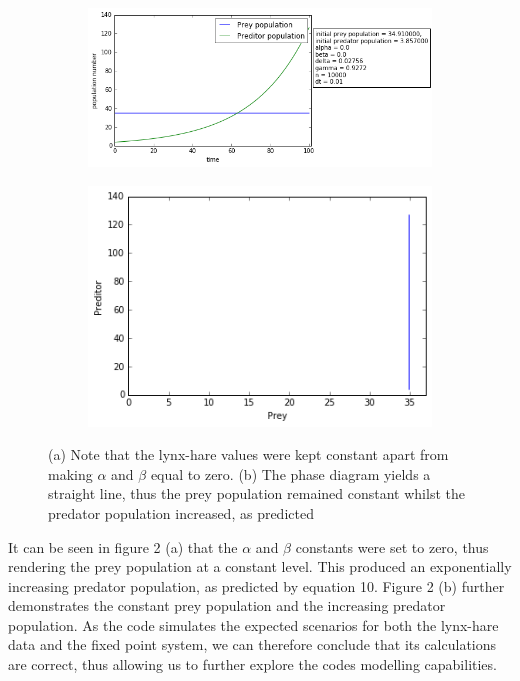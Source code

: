 \documentclass[11pt]{elsarticle}
\begin{document}
\begin{figure}
\centering
   \begin{subfigure}[b]{1\textwidth}
   \includegraphics[width=0.90\linewidth]{figure2_time.png}
   \caption{}
   \label{fig:Ng1} 
\end{subfigure}

\begin{subfigure}[b]{1\textwidth}
   \includegraphics[width=0.59\linewidth]{figure2_phase.png}
   \caption{}
   \label{fig:Ng2}
\end{subfigure}

\caption{(a) Note that the lynx-hare values were kept constant apart from making $\alpha$ and $\beta$ equal to zero. (b) The phase diagram yields a straight line, thus the prey population remained constant whilst the predator population increased, as predicted }
\end{figure}

It can be seen in figure 2 (a) that the $\alpha$ and $\beta$ constants were set to zero, thus rendering the prey population at a constant level. This produced an exponentially increasing predator population, as predicted by equation 10. Figure 2 (b) further demonstrates the constant prey population and the increasing predator population. As the code simulates the expected scenarios for both the lynx-hare data and the fixed point system, we can therefore conclude that its calculations are correct, thus allowing us to further explore the codes modelling capabilities. 
\newline
\end{document}
